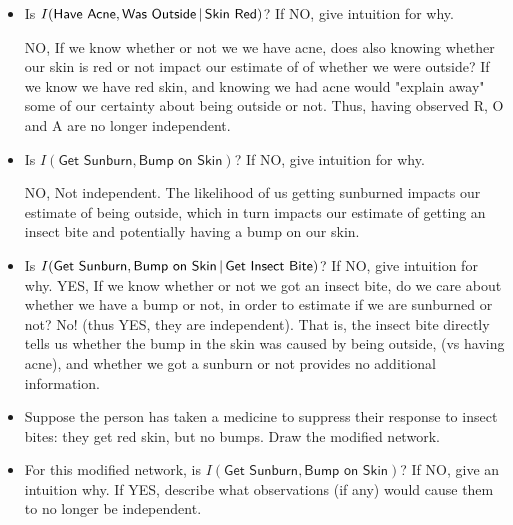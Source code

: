 \documentclass[submit]{harvardml}
\newcommand{\attr}[1]{\textsf{#1}}
\newenvironment{answer}{%
\color{answergreen}\sffamily\large}{}
\begin{document}
\begin{itemize}
        \item Is $I(\attr{Have Acne},\attr{Was Outside}\given \attr{Skin Red})$? If NO, give
        intuition for why.

            \begin{answer}
                NO, If we know whether or not we we have acne, does also knowing whether our skin is red
                or not impact our estimate of of whether we were outside? If we know we have red skin,
                and knowing we had acne would "explain away" some of our certainty about being outside
                or not. Thus, having observed R, O and A are no longer independent.
            \end{answer}

        \item Is $I(\attr{Get Sunburn},\attr{Bump on Skin})$? If NO, give
        intuition for why.

            \begin{answer}
                 NO, Not independent. The likelihood of us getting sunburned impacts our estimate of being
                 outside, which in turn impacts our estimate of getting an insect bite and potentially
                 having a bump on our skin. 
            \end{answer}

        \item Is $I(\attr{Get Sunburn},\attr{Bump on Skin}\given \attr{Get Insect Bite})$? If NO, give intuition for why.
            \begin{answer}
                YES, If we know whether or not we got an insect bite, do we care about whether we have a
                bump or not, in order to estimate if we are sunburned or not? No! (thus YES, they are
                independent). That is, the insect bite directly tells us whether the bump in the skin
                was caused by being outside, (vs having acne), and whether we got a sunburn or not
                provides no additional information.
            \end{answer}

        \item Suppose the person has taken a medicine to suppress their
          response to insect bites: they get red skin, but no bumps.  Draw the
          modified network.  

        \item For this modified network, is $I(\attr{Get Sunburn},\attr{Bump
          on Skin})$? If NO, give an intuition why.  If YES, describe what
          observations (if any) would cause them to no longer be independent.    


\end{itemize}
\end{document}

